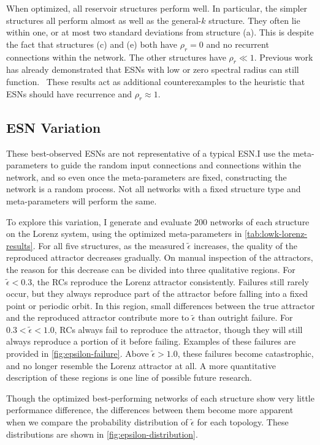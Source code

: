 When optimized, all reservoir structures perform well. In particular,
the simpler structures all perform almost as well as the general-$k$
structure. They often lie within one, or at most two standard
deviations from structure (a). This is despite the fact that
structures (c) and (e) both have $\rho_r=0$ and no recurrent
connections within the network. The other structures have
$\rho_r\ll1$.  Previous work has already demonstrated that ESNs with
low or zero spectral radius can still
function.~\cite{pathak2017,rodan2011} These results act as additional
counterexamples to the heuristic that ESNs should have recurrence and
$\rho_r \approx 1$.~\cite{lukosevicius2012}

\subsection{ESN Variation}

These best-observed ESNs are not representative of a
typical ESN.\@ I use the meta-parameters to guide the random input
connections and connections within the network, and so even once the
meta-parameters are fixed, constructing the network is a random
process. Not all networks with a fixed structure type and meta-parameters
will perform the same.

To explore this variation, I generate and evaluate $200$ networks of
each structure on the Lorenz system, using the optimized
meta-parameters in \cref{tab:lowk-lorenz-results}. For all five
structures, as the measured $\tilde{\epsilon}$ increases, the quality
of the reproduced attractor decreases gradually. On manual inspection
of the attractors, the reason for this decrease can be divided into
three qualitative regions. For $\tilde{\epsilon} < 0.3$, the RCs
reproduce the Lorenz attractor consistently. Failures still rarely
occur, but they always reproduce part of the attractor before falling
into a fixed point or periodic orbit. In this region, small
differences between the true attractor and the reproduced attractor
contribute more to $\tilde{\epsilon}$ than outright failure. For $0.3
< \tilde{\epsilon} < 1.0$, RCs always fail to reproduce the attractor,
though they will still always reproduce a portion of it before
failing. Examples of these failures are provided in
\cref{fig:epsilon-failure}. Above $\tilde{\epsilon} > 1.0$, these
failures become catastrophic, and no longer resemble the Lorenz
attractor at all. A more quantitative description of these regions is
one line of possible future research.

Though the optimized best-performing networks of
each structure show very little performance difference, the differences
between them become more apparent when we compare the probability
distribution of $\tilde{\epsilon}$ for each topology. These
distributions are shown in \cref{fig:epsilon-distribution}.


